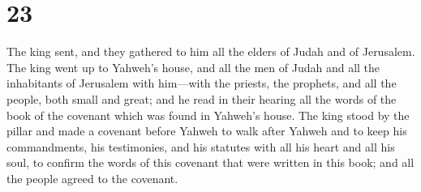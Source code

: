 \hypertarget{section-22}{%
\section{23}\label{section-22}}

 The king sent, and they gathered to him all the elders of
Judah and of Jerusalem.  The king went up to Yahweh's house,
and all the men of Judah and all the inhabitants of Jerusalem with
him---with the priests, the prophets, and all the people, both small and
great; and he read in their hearing all the words of the book of the
covenant which was found in Yahweh's house.  The king stood
by the pillar and made a covenant before Yahweh to walk after Yahweh and
to keep his commandments, his testimonies, and his statutes with all his
heart and all his soul, to confirm the words of this covenant that were
written in this book; and all the people agreed to the covenant.


